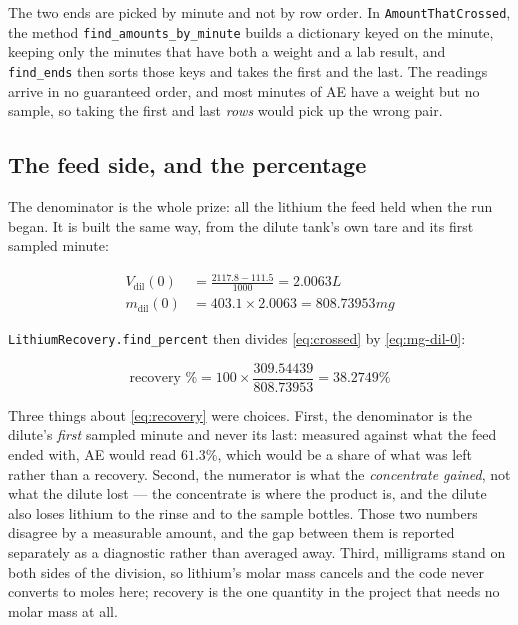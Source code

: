 The two ends are picked by minute and not by row order.
In \texttt{AmountThatCrossed}, the method
\texttt{find\_amounts\_by\_minute} builds a dictionary keyed on the minute, keeping only
the minutes that have both a weight and a lab result, and \texttt{find\_ends} then sorts
those keys and takes the first and the last. The readings arrive in no guaranteed order, and
most minutes of AE have a weight but no sample, so taking the first and last \emph{rows}
would pick up the wrong pair.

\subsection{The feed side, and the percentage}

The denominator is the whole prize: all the lithium the feed held when the run began. It is
built the same way, from the dilute tank's own tare and its first sampled minute:

\begin{align}
  V_{\mathrm{dil}}(0) &= \frac{2117.8 - 111.5}{1000} = 2.0063\unit{L} \label{eq:v-dil-0} \\
  m_{\mathrm{dil}}(0) &= 403.1 \times 2.0063 = 808.73953\unit{mg} \label{eq:mg-dil-0}
\end{align}

\texttt{LithiumRecovery.find\_percent} then divides \eqref{eq:crossed} by
\eqref{eq:mg-dil-0}:

\begin{equation}
  \text{recovery \%} = 100 \times \frac{309.54439}{808.73953} = 38.2749\%
  \label{eq:recovery}
\end{equation}

Three things about \eqref{eq:recovery} were choices. First, the denominator is the dilute's
\emph{first} sampled minute and never its last: measured against what the feed ended with,
AE would read $61.3\%$, which would be a share of what was left rather than a recovery.
Second, the numerator is what the \emph{concentrate gained}, not what the dilute lost --- the
concentrate is where the product is, and the dilute also loses lithium to the rinse and to the
sample bottles. Those two numbers disagree by a measurable amount, and the gap between them is
reported separately as a diagnostic rather than averaged away. Third, milligrams stand on both
sides of the division, so lithium's molar mass cancels and the code never converts to moles
here; recovery is the one quantity in the project that needs no molar mass at all.

